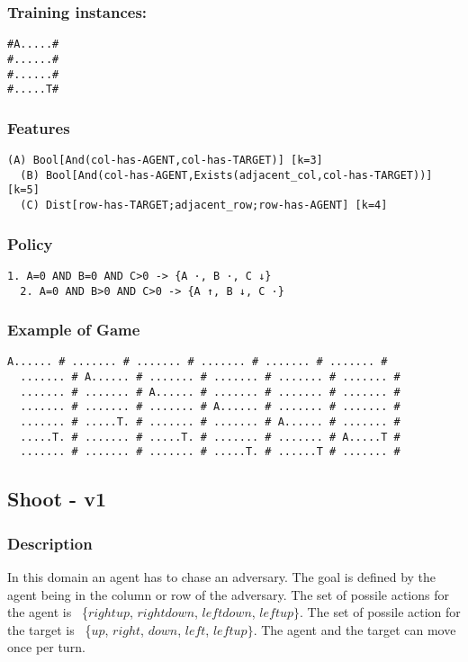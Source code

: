 \documentclass[a4paper]{article}
\begin{document}
\subsubsection{Training instances:}
\begin{Verbatim}[fontsize=\footnotesize]
#A.....#
#......#
#......#
#.....T#
\end{Verbatim}

\subsubsection{Features}
\begin{Verbatim}[fontsize=\footnotesize]
  (A) Bool[And(col-has-AGENT,col-has-TARGET)] [k=3]
  (B) Bool[And(col-has-AGENT,Exists(adjacent_col,col-has-TARGET))] [k=5]
  (C) Dist[row-has-TARGET;adjacent_row;row-has-AGENT] [k=4]

\end{Verbatim}

\subsubsection{Policy}
\begin{Verbatim}[fontsize=\footnotesize]
  1. A=0 AND B=0 AND C>0 -> {A ·, B ·, C ↓}
  2. A=0 AND B>0 AND C>0 -> {A ↑, B ↓, C ·}
\end{Verbatim}

\subsubsection{Example of Game}
\begin{Verbatim}[fontsize=\footnotesize]
  A...... # ....... # ....... # ....... # ....... # ....... #
  ....... # A...... # ....... # ....... # ....... # ....... #
  ....... # ....... # A...... # ....... # ....... # ....... #
  ....... # ....... # ....... # A...... # ....... # ....... #
  ....... # .....T. # ....... # ....... # A...... # ....... #
  .....T. # ....... # .....T. # ....... # ....... # A.....T #
  ....... # ....... # ....... # .....T. # ......T # ....... #
\end{Verbatim}

\subsection{Shoot - v1}
\subsubsection{Description}
In this domain an agent has to chase an adversary. The goal is defined by the agent being in the column or row of the adversary. The set of possile actions for the agent is ~\{$rightup$, $rightdown$, $leftdown$, $leftup\}$.
The set of possile action for the target is ~\{$up$, $right$, $down$, $left$, $leftup\}$.  The agent and the target can move once per turn.
\end{document}
